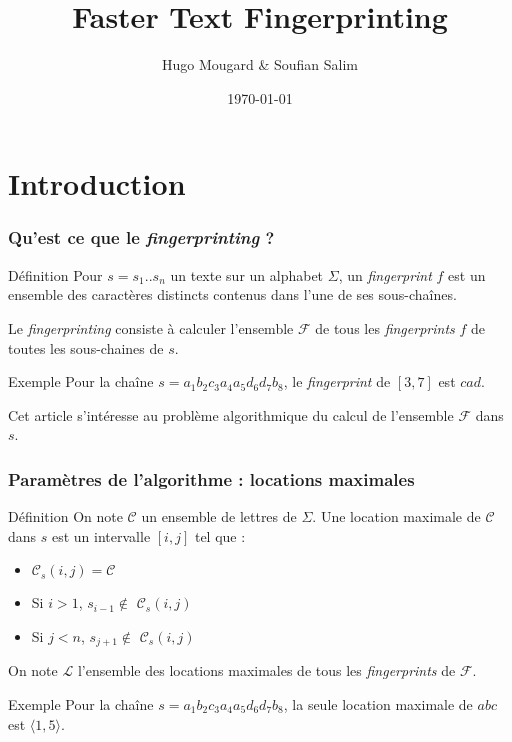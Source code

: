 \documentclass[10pt]{beamer}
\title{Faster Text Fingerprinting}
\author{Hugo Mougard \& Soufian Salim}
\date{\today}
\begin{document}
\begin{frame}
  	\maketitle
\end{frame}

\begin{frame}
	\tableofcontents
\end{frame}

\section{Introduction}

\begin{frame}
	\frametitle{Qu'est ce que le \textit{fingerprinting} ?}
	
	\begin{block}{Définition}
		Pour $s = s_{1} .. s_{n}$ un texte sur un alphabet $\Sigma$, un \textit{fingerprint} $f$ est un ensemble des caractères distincts contenus dans l'une de ses sous-chaînes. \newline
	
	Le \textit{fingerprinting} consiste à calculer l'ensemble $\mathcal{F}$ de tous les \textit{fingerprints} $f$ de toutes les sous-chaines de $s$. 
	\end{block}
	
	\begin{block}{Exemple}
		Pour la chaîne $s = a_{1} b_{2} c_{3} a_{4} a_{5} d_{6} d_{7} b_{8}$, le \textit{fingerprint} de $[3,7]$ est $cad$.
	\end{block}
	
	Cet article s'intéresse au problème algorithmique du calcul de l'ensemble $\mathcal{F}$ dans $s$.	
\end{frame}

\begin{frame}
	\frametitle{Paramètres de l'algorithme : locations maximales}
	
	\begin{block}{Définition}
		On note $\mathcal{C}$ un ensemble de lettres de $\Sigma$. Une location maximale de $\mathcal{C}$ dans $s$ est un intervalle $[i,j]$ tel que :
		
		\begin{itemize}
			\item $\mathcal{C}_{s}(i,j) = \mathcal{C}$
			\item Si $i > 1$, $s_{i-1} \notin$ $\mathcal{C}_{s}(i,j)$
			\item Si $j < n$, $s_{j+1} \notin$ $\mathcal{C}_{s}(i,j)$
		\end{itemize}
		
		On note $\mathcal{L}$ l'ensemble des locations maximales de tous les \textit{fingerprints} de $\mathcal{F}$.
	\end{block}
	
	\begin{block}{Exemple}
		Pour la chaîne $s = a_{1} b_{2} c_{3} a_{4} a_{5} d_{6} d_{7} b_{8}$, la seule location maximale de $abc$ est $\langle1,5\rangle$.
	\end{block}
\end{frame}
\end{document}
